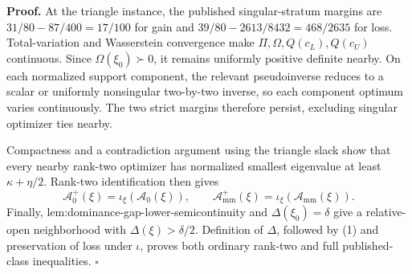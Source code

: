 \textbf{Proof.}
At the triangle instance, the published singular-stratum margins are \(31/80-87/400=17/100\) for gain and \(39/80-2613/8432=468/2635\) for loss.  Total-variation and Wasserstein convergence make \(\Pi,\Omega,Q(c_L),Q(c_U)\) continuous.  Since \(\Omega(\xi_0)\succ0\), it remains uniformly positive definite nearby.  On each normalized support component, the relevant pseudoinverse reduces to a scalar or uniformly nonsingular two-by-two inverse, so each component optimum varies continuously.  The two strict margins therefore persist, excluding singular optimizer ties nearby.

Compactness and a contradiction argument using the triangle slack show that every nearby rank-two optimizer has normalized smallest eigenvalue at least \(\kappa+\eta/2\).  Rank-two identification then gives
\[
\mathcal A_0^+(\xi)=\iota_\xi(\mathcal A_0(\xi)),
\qquad
\mathcal A_{\mathrm{mm}}^+(\xi)=\iota_\xi(\mathcal A_{\mathrm{mm}}(\xi)).
\tag{1}
\]
Finally, lem:dominance-gap-lower-semicontinuity and \(\Delta(\xi_0)=\delta\) give a relative-open neighborhood with \(\Delta(\xi)>\delta/2\).  Definition of \(\Delta\), followed by (1) and preservation of loss under \(\iota\), proves both ordinary rank-two and full published-class inequalities. \(\square\)